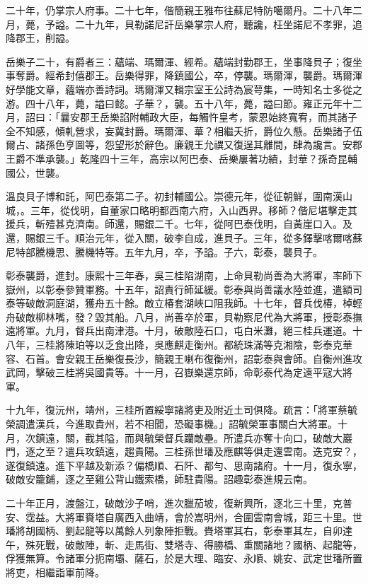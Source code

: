 \begin{pinyinscope}
二十年，仍掌宗人府事。二十七年，偕簡親王雅布往蘇尼特防噶爾丹。二十八年二月，薨，予謚。二十九年，貝勒諾尼訐岳樂掌宗人府，聽讒，枉坐諾尼不孝罪，追降郡王，削謚。

岳樂子二十，有爵者三：蘊端、瑪爾渾、經希。蘊端封勤郡王，坐事降貝子；復坐事奪爵。經希封僖郡王。岳樂得罪，降鎮國公，卒，停襲。瑪爾渾，襲爵。瑪爾渾好學能文章，蘊端亦善詩詞。瑪爾渾又輯宗室王公詩為宸萼集，一時知名士多從之游。四十八年，薨，謚曰懿。子華？，襲。五十八年，薨，謚曰節。雍正元年十二月，詔曰：「曩安郡王岳樂諂附輔政大臣，每觸忤皇考，蒙恩始終寬宥，而其諸子全不知感，傾軋營求，妄冀封爵。瑪爾渾、華？相繼夭折，爵位久懸。岳樂諸子伍爾占、諸孫色亨圖等，怨望形於辭色。廉親王允禩又復逞其離間，肆為讒言。安郡王爵不準承襲。」乾隆四十三年，高宗以阿巴泰、岳樂屢著功績，封華？孫奇昆輔國公，世襲。

溫良貝子博和託，阿巴泰第二子。初封輔國公。崇德元年，從征朝鮮，圍南漢山城，。三年，從伐明，自董家口略明都西南六府，入山西界。移師？偕尼堪擊走其援兵，斬殪甚克濟南。師還，賜銀二千。七年，從阿巴泰伐明，自黃崖口入。及還，賜銀三千。順治元年，從入關，破李自成，進貝子。三年，從多鐸擊喀爾喀蘇尼特部騰機思、騰機特等。五年九月，卒，予謚。子六，彰泰，襲貝子。

彰泰襲爵，進封。康熙十三年春，吳三桂陷湖南，上命貝勒尚善為大將軍，率師下嶽州，以彰泰參贊軍務。十五年，詔責行師延緩。彰泰與尚善議水陸並進，遣額司泰等破敵洞庭湖，獲舟五十餘。敵立椿套湖峽口阻我師。十七年，督兵伐椿，棹輕舟破敵柳林嘴，發？毀其船。八月，尚善卒於軍，貝勒察尼代為大將軍，授彰泰撫遠將軍。九月，督兵出南津港。十月，破敵陸石口，屯白米灘，絕三桂兵運道。十八年，三桂將陳珀等以乏食出降，吳應麒走衡州。都統珠滿等克湘陰，彰泰克華容、石首。會安親王岳樂復長沙，簡親王喇布復衡州，詔彰泰與會師。自衡州進攻武岡，擊破三桂將吳國貴等。十一月，召嶽樂還京師，命彰泰代為定遠平寇大將軍。

十九年，復沅州，靖州，三桂所置綏寧諸將吏及附近土司俱降。疏言：「將軍蔡毓榮調遣漢兵，今進取貴州，若不相聞，恐礙事機。」詔毓榮軍事關白大將軍。十月，次鎮遠，關，截其隘，而與毓榮督兵躪敵壘。所遣兵亦奪十向口，破敵大巖門，逐之至？遣兵攻鎮遠，趨貴陽。三桂孫世璠及應麒等俱走還雲南。迭克安？，遂復鎮遠。進下平越及新添？偏橋順、石阡、都勻、思南諸府。十一月，復永寧，破敵安籠鋪，逐之至雞公背山鐵索橋，師駐貴陽。詔趣彰泰進規云南。

二十年正月，渡盤江，破敵沙子哨，進次臘茄坡，復新興所，逐北三十里，克普安、霑益。大將軍賚塔自廣西入曲靖，會於嵩明州，合圍雲南會城，距三十里。世璠將胡國柄、劉起龍等以萬餘人列象陣拒戰。賚塔軍其右，彰泰軍其左，自卯達午，殊死戰，破敵陣，斬、走馬街、雙塔寺、得勝橋、重關諸地？國柄、起龍等，俘獲無算。令諸軍分扼南壩、薩石，於是大理、臨安、永順、姚安、武定世璠所置將吏，相繼詣軍前降。


\end{pinyinscope}
